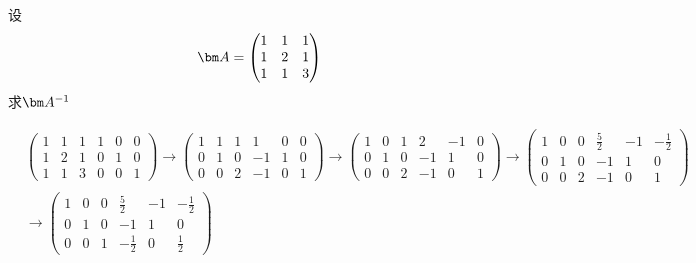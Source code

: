 \begin{example}
    设
    \[
        \mat{A} =
        \begin{pmatrix}
            1 & 1 & 1 \\
            1 & 2 & 1 \\
            1 & 1 & 3
        \end{pmatrix}
    \]
    求$\mat{A}^{-1}$
\end{example}
\begin{solution}
    \begin{align*}
         & \left(
        \begin{array}{ccc|ccc}
            1 & 1 & 1 & 1 & 0 & 0 \\
            1 & 2 & 1 & 0 & 1 & 0 \\
            1 & 1 & 3 & 0 & 0 & 1
        \end{array}
        \right)
        \rightarrow
        \left(
        \begin{array}{ccc|ccc}
            1 & 1 & 1 & 1  & 0 & 0 \\
            0 & 1 & 0 & -1 & 1 & 0 \\
            0 & 0 & 2 & -1 & 0 & 1
        \end{array}
        \right)
        \rightarrow
        \left(
        \begin{array}{ccc|ccc}
            1 & 0 & 1 & 2  & -1 & 0 \\
            0 & 1 & 0 & -1 & 1  & 0 \\
            0 & 0 & 2 & -1 & 0  & 1
        \end{array}
        \right)
        \rightarrow
        \left(
        \begin{array}{ccc|ccc}
            1 & 0 & 0 & \frac{5}{2} & -1 & -\frac{1}{2} \\
            0 & 1 & 0 & -1          & 1  & 0            \\
            0 & 0 & 2 & -1          & 0  & 1
        \end{array}
        \right)        \\
         & \rightarrow
        \left(
        \begin{array}{ccc|ccc}
            1 & 0 & 0 & \frac{5}{2}  & -1 & -\frac{1}{2} \\
            0 & 1 & 0 & -1           & 1  & 0            \\
            0 & 0 & 1 & -\frac{1}{2} & 0  & \frac{1}{2}
        \end{array}
        \right)
    \end{align*}

\end{solution}
